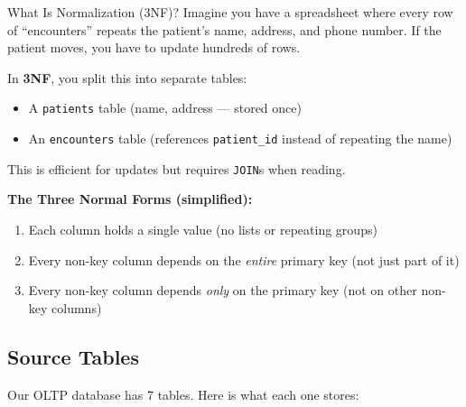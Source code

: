 \documentclass[12pt, a4paper, oneside]{report}
\begin{document}
\begin{conceptbox}{What Is Normalization (3NF)?}
Imagine you have a spreadsheet where every row of ``encounters'' repeats the patient's name, address, and phone number. If the patient moves, you have to update hundreds of rows.

In \textbf{3NF}, you split this into separate tables:
\begin{itemize}
    \item A \texttt{patients} table (name, address --- stored once)
    \item An \texttt{encounters} table (references \texttt{patient\_id} instead of repeating the name)
\end{itemize}
This is efficient for updates but requires \texttt{JOIN}s when reading.

\textbf{The Three Normal Forms (simplified):}
\begin{enumerate}[label=\textcolor{primary}{\textbf{\arabic*NF:}}]
    \item Each column holds a single value (no lists or repeating groups)
    \item Every non-key column depends on the \textit{entire} primary key (not just part of it)
    \item Every non-key column depends \textit{only} on the primary key (not on other non-key columns)
\end{enumerate}
\end{conceptbox}

\subsection{Source Tables}

Our OLTP database has 7 tables. Here is what each one stores:
\end{document}
